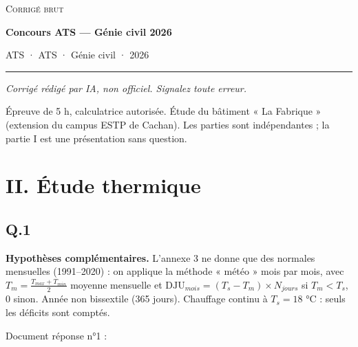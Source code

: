 \documentclass[11pt,a4paper]{article}
\begin{document}
\thispagestyle{plain}
\begin{center}
  {\small\scshape Corrigé brut}\par\smallskip
  {\LARGE\bfseries Concours ATS — Génie civil 2026\par}\medskip
  {\large ATS · ATS · Génie civil · 2026\par}
\end{center}
\vspace{2pt}\hrule\vspace{8pt}

\emph{Corrigé rédigé par IA, non officiel. Signalez toute erreur.}

Épreuve de 5 h, calculatrice autorisée. Étude du bâtiment « La Fabrique » (extension du campus ESTP de Cachan). Les parties sont indépendantes ; la partie I est une présentation sans question.

\hypertarget{ii.-uxe9tude-thermique}{%
\section{II. Étude thermique}\label{ii.-uxe9tude-thermique}}

\hypertarget{q.1}{%
\subsection{Q.1}\label{q.1}}

\textbf{Hypothèses complémentaires.} L'annexe 3 ne donne que des normales mensuelles (1991--2020) : on applique la méthode « météo » mois par mois, avec \(T_m=\frac{T_{max}+T_{min}}{2}\) moyenne mensuelle et \(\text{DJU}_{mois}=(T_s-T_m)\times N_{jours}\) si \(T_m<T_s\), 0 sinon. Année non bissextile (365 jours). Chauffage continu à \(T_s=18\) °C : seuls les déficits sont comptés.

Document réponse n°1 :
\end{document}
